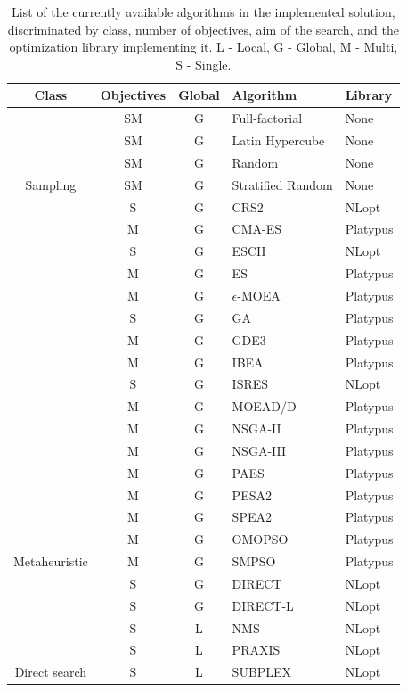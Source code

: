 \begin{table}[]
	\centering
	\caption[List of the algorithms currently supported by the solution]{List of the currently available algorithms in the implemented solution, discriminated by class, number of objectives, aim of the search, and the optimization library implementing it. L - Local, G - Global, M - Multi, S - Single.}
	\label{table:algorithms}
	\begin{tabular}{cccll}
		\rowcolor[HTML]{EFEFEF} 
		\textbf{Class} & \textbf{Objectives} & \textbf{Global} & \textbf{Algorithm} & \textbf{Library} \\ \hline
		& SM & G & Full-factorial & None \\
		& SM & G & Latin Hypercube & None \\
		& SM & G & Random & None \\
		\multirow{-4}{*}{Sampling} & SM & G & Stratified Random & None \\ \hline
		& S & G & CRS2 & NLopt \\
		& M & G & CMA-ES & Platypus \\
		& S & G & ESCH & NLopt \\
		& M & G & ES & Platypus \\
		& M & G & $\epsilon$-MOEA & Platypus \\
		& S & G & GA & Platypus \\
		& M & G & GDE3 & Platypus \\
		& M & G & IBEA & Platypus \\
		& S & G & ISRES & NLopt \\
		& M & G & MOEAD/D & Platypus \\
		& M & G & NSGA-II & Platypus \\
		& M & G & NSGA-III & Platypus \\
		& M & G & PAES & Platypus \\
		& M & G & PESA2 & Platypus \\
		& M & G & SPEA2 & Platypus \\
		& M & G & OMOPSO & Platypus \\
		\multirow{-17}{*}{Metaheuristic} & M & G & SMPSO & Platypus \\ \hline
		& S & G & DIRECT & NLopt \\
		& S & G & DIRECT-L & NLopt \\
		& S & L & NMS & NLopt \\
		& S & L & PRAXIS & NLopt \\
		\multirow{-5}{*}{Direct search} & S & L & SUBPLEX & NLopt \\ \hline

\end{tabular}
\end{table}
